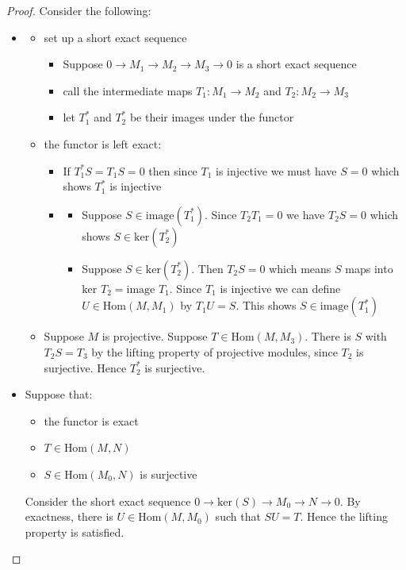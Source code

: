 \documentclass[a4paper,11pt]{article}
\begin{document}
\begin{proof}
  Consider the following:
  \begin{itemize}
    \item 
    
    \begin{itemize}
      \item set up a short exact sequence
          \begin{itemize}
            \item Suppose $0 \to M_1 \to M_2 \to M_3 \to 0$ is a short exact sequence
            \item call the intermediate maps $T_1 : M_1 \to M_2$ and $T_2: M_2 \to M_3$  
            \item let $T_1^*$ and $T_2^*$ be their images under the functor
          \end{itemize}
      
      \item the functor is left exact:
            \begin{itemize}
              \item If $T_1^*S=T_1S=0$ then since $T_1$ is injective we must have $S=0$ which shows $T_1^*$ is injective
              \item 
                \begin{itemize}
                  \item Suppose $S \in \text{image}(T_1^*)$. Since $T_2T_1=0$ we have $T_2S=0$ which shows $S \in \text{ker}(T_2^*)$
                  \item Suppose $S \in \text{ker}(T_2^*)$. Then $T_2S=0$ which means $S$ maps into $\text{ker }T_2 = \text{image }T_1$. 
                        Since $T_1$ is injective we can define $U \in \text{Hom}(M,M_1)$ by $T_1U=S$. This shows $S \in \text{image}(T_1^*)$
                \end{itemize}
            \end{itemize} 
    
      \item Suppose $M$ is projective. Suppose $T \in \text{Hom}(M,M_3)$. 
            There is $S$ with $T_2S=T_3$ by the lifting property of projective modules, since $T_2$ is surjective.
            Hence $T_2^*$ is surjective.
    \end{itemize}
    
    \item Suppose that:
          \begin{itemize}
            \item the functor is exact
            \item $T \in \text{Hom}(M,N)$
            \item $S \in \text{Hom}(M_0,N)$ is surjective
          \end{itemize}
          Consider the short exact sequence $0 \to \text{ker}(S) \to M_0 \to N \to 0$. 
          By exactness, there is $U \in \text{Hom}(M,M_0)$ such that $SU=T$. Hence the lifting property is satisfied.
  \end{itemize}
\end{proof}
\end{document}
